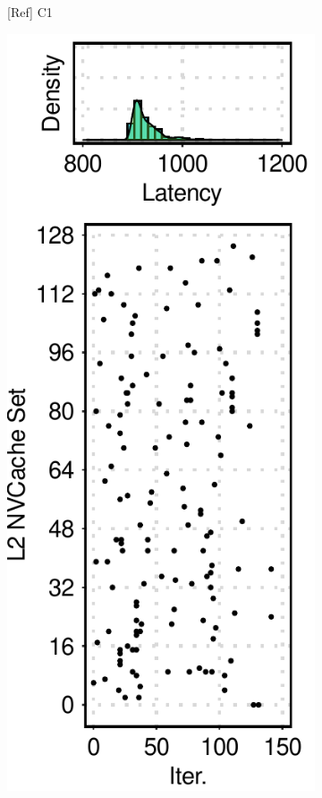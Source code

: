 \begin{figure}[t]
\begin{subfigure}[b]{.12\textwidth}
        \caption{[Ref] C1}
        \label{fig:12:ref:side-channel-feature-c1}
    \end{subfigure}
    \hfill
    \begin{subfigure}[b]{.12\textwidth}
        \centering
        \includegraphics[width=\linewidth]{figure/plot/reference/fig12-side-sql-c2.pdf}

\end{subfigure}
\end{figure}
